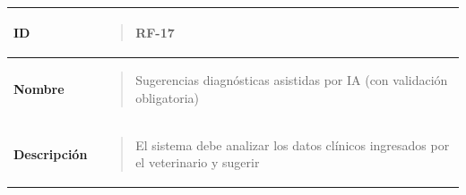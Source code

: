 \documentclass[
]{article}
\newcounter{none} %
\begin{document}
{\def\LTcaptype{none} %
\begin{longtable}[]{@{}
  >{\raggedright\arraybackslash}p{}
  >{\raggedright\arraybackslash}p{}@{}}
\toprule\noalign{}
\begin{minipage}[b]{\linewidth}\raggedright
\textbf{ID}
\end{minipage} & \begin{minipage}[b]{\linewidth}\raggedright
\begin{quote}
RF-17
\end{quote}
\end{minipage} \\
\midrule\noalign{}
\endhead
\bottomrule\noalign{}
\endlastfoot
\textbf{Nombre} & \begin{minipage}[t]{\linewidth}\raggedright
\begin{quote}
Sugerencias diagnósticas asistidas por IA (con validación obligatoria)
\end{quote}
\end{minipage} \\
\textbf{Descripción} & \begin{minipage}[t]{\linewidth}\raggedright
\begin{quote}
El sistema debe analizar los datos clínicos ingresados por el
veterinario y sugerir


\end{quote}
\end{minipage}
\end{longtable}}
\end{document}
